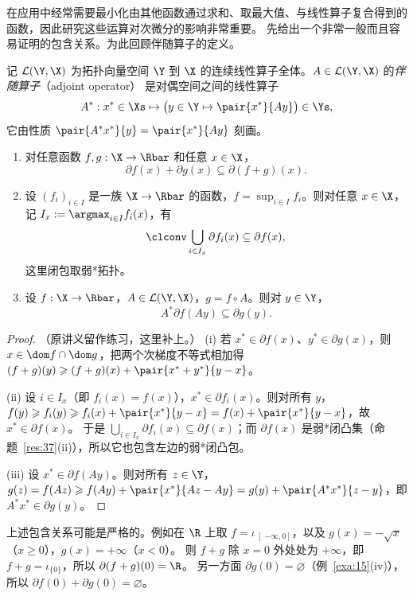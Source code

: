 在应用中经常需要最小化由其他函数通过求和、取最大值、与线性算子复合得到的函数，因此研究这些运算对次微分的影响非常重要。
先给出一个非常一般而且容易证明的包含关系。为此回顾伴随算子的定义。

\begin{definition}[伴随算子]
\label{def:25}
记 $\mathcal L(\Y,\X)$ 为拓扑向量空间 $\Y$ 到 $\X$ 的连续线性算子全体。$A\in\mathcal L(\Y,\X)$ 的\emph{伴随算子}（adjoint operator）
是对偶空间之间的线性算子
\[
  A^*:x^*\in\Xs\mapsto\bigl(y\in\Y\mapsto\pair{x^*}{Ay}\bigr)\in\Ys ,
\]
它由性质 $\pair{A^*x^*}{y}=\pair{x^*}{Ay}$ 刻画。
\end{definition}

\begin{proposition}[包含关系]
\label{res:39}
\leavevmode
\begin{enumerate}[label=(\roman*)]
  \item 对任意函数 $f,g:\X\to\Rbar$ 和任意 $x\in\X$，
        \[
          \partial f(x)+\partial g(x)\subseteq\partial(f+g)(x).
        \]
  \item 设 $(f_i)_{i\in I}$ 是一族 $\X\to\Rbar$ 的函数，$f=\sup_{i\in I}f_i$。则对任意 $x\in\X$，记 $I_x:=\argmax_{i\in I}f_i(x)$，有
        \[
          \clconv\bigcup_{i\in I_x}\partial f_i(x)\subseteq\partial f(x),
        \]
        这里闭包取弱*拓扑。
  \item 设 $f:\X\to\Rbar$，$A\in\mathcal L(\Y,\X)$，$g=f\circ A$。则对 $y\in\Y$，
        \[
          A^*\partial f(Ay)\subseteq\partial g(y).
        \]
\end{enumerate}
\end{proposition}

\begin{proof}
（原讲义留作练习，这里补上。）
(i) 若 $x^*\in\partial f(x)$、$y^*\in\partial g(x)$，则 $x\in\dom f\cap\dom g$，把两个次梯度不等式相加得
$(f+g)(y)\geqslant(f+g)(x)+\pair{x^*+y^*}{y-x}$。

(ii) 设 $i\in I_x$（即 $f_i(x)=f(x)$），$x^*\in\partial f_i(x)$。则对所有 $y$，
$f(y)\geqslant f_i(y)\geqslant f_i(x)+\pair{x^*}{y-x}=f(x)+\pair{x^*}{y-x}$，故 $x^*\in\partial f(x)$。
于是 $\bigcup_{i\in I_x}\partial f_i(x)\subseteq\partial f(x)$；而 $\partial f(x)$ 是弱*闭凸集（命题~\ref{res:37}(ii)），所以它也包含左边的弱*闭凸包。

(iii) 设 $x^*\in\partial f(Ay)$。则对所有 $z\in\Y$，
$g(z)=f(Az)\geqslant f(Ay)+\pair{x^*}{Az-Ay}=g(y)+\pair{A^*x^*}{z-y}$，即 $A^*x^*\in\partial g(y)$。
\end{proof}

\begin{remark}[一个反例]
\label{rem:17}
上述包含关系可能是严格的。例如在 $\R$ 上取 $f=\iota_{\left]-\infty,0\right]}$，以及 $g(x)=-\sqrt x$（$x\geqslant0$），$g(x)=+\infty$（$x<0$）。
则 $f+g$ 除 $x=0$ 外处处为 $+\infty$，即 $f+g=\iota_{\{0\}}$，所以 $\partial(f+g)(0)=\R$。
另一方面 $\partial g(0)=\varnothing$（例~\ref{exa:15}(iv)），所以 $\partial f(0)+\partial g(0)=\varnothing$。
\end{remark}

